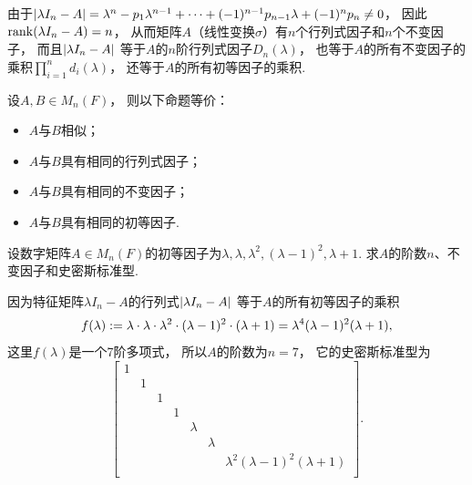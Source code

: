 由于\(
	\DeterminantA{\lambda I_n - A}
	= \lambda^n - p_1 \lambda^{n-1}
	+ \dotsb + (-1)^{n-1} p_{n-1} \lambda
	+ (-1)^n p_n
	\neq 0  %
\)，
因此\(\rank(\lambda I_n - A) = n\)，
从而矩阵\(A\)（线性变换\(\sigma\)）有\(n\)个行列式因子和\(n\)个不变因子，
而且\(\abs{\lambda I_n - A}\)
等于\(A\)的\(n\)阶行列式因子\(D_n(\lambda)\)，
也等于\(A\)的所有不变因子的乘积\(\prod_{i=1}^n d_i(\lambda)\)，
还等于\(A\)的所有初等因子的乘积.
\begin{theorem}
设\(A,B \in M_n(F)\)，
则以下命题等价：\begin{itemize}
	\item \(A\)与\(B\)相似；
	\item \(A\)与\(B\)具有相同的行列式因子；
	\item \(A\)与\(B\)具有相同的不变因子；
	\item \(A\)与\(B\)具有相同的初等因子.
\end{itemize}
\end{theorem}

\begin{example}
设数字矩阵\(A \in M_n(F)\)的初等因子为\(\lambda,\lambda,\lambda^2,(\lambda-1)^2,\lambda+1\).
求\(A\)的阶数\(n\)、不变因子和史密斯标准型.
\begin{solution}
因为特征矩阵\(\lambda I_n - A\)的行列式\(\abs{\lambda I_n - A}\)
等于\(A\)的所有初等因子的乘积\begin{equation*}
	f(\lambda)
	:=
	\lambda \cdot \lambda \cdot \lambda^2 \cdot (\lambda-1)^2 \cdot (\lambda+1)
	= \lambda^4(\lambda-1)^2(\lambda+1),
\end{equation*}
这里\(f(\lambda)\)是一个7阶多项式，
所以\(A\)的阶数为\(n=7\)，
它的史密斯标准型为\begin{equation*}
	\begin{bmatrix}
		1 \\
		& 1 \\
		&& 1 \\
		&&& 1 \\
		&&&& \lambda \\
		&&&&& \lambda \\
		&&&&&& \lambda^2(\lambda-1)^2(\lambda+1) \\
	\end{bmatrix}.
\end{equation*}
\end{solution}
\end{example}

